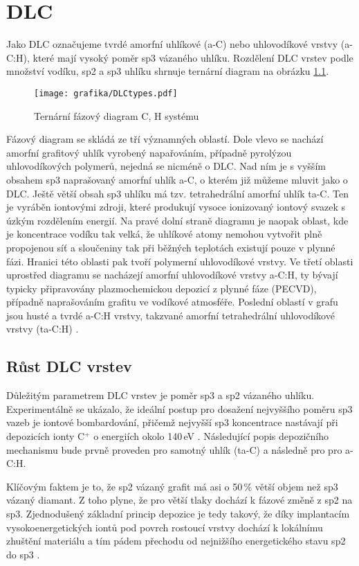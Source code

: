 \chapter{DLC}
Jako DLC označujeme tvrdé amorfní uhlíkové (a-C) nebo uhlovodíkové vrstvy (a-C:H), které mají vysoký poměr sp3 vázaného uhlíku. Rozdělení DLC vrstev podle množství vodíku, sp2 a sp3 uhlíku shrnuje ternární diagram na obrázku \ref{DLCtypes}.

\begin{figure}[htbp]
  \centering
  \texttt{[image: grafika/DLCtypes.pdf]}
  \caption{Ternární fázový diagram C, H systému \cite{Robertson2002}}
  \label{DLCtypes}
\end{figure}

Fázový diagram se skládá ze tří významných oblastí. Dole vlevo se nachází amorfní grafitový uhlík vyrobený napařováním, případně pyrolýzou uhlovodíkových polymerů, nejedná se nicméně o DLC. Nad ním je s vyšším obsahem sp3 naprašovaný amorfní uhlík a-C, o kterém již můžeme mluvit jako o DLC. Ještě větší obsah sp3 uhlíku má tzv. tetrahedrální amorfní uhlík ta-C. Ten je vyráběn iontovými zdroji, které produkují vysoce ionizovaný iontový svazek s úzkým rozdělením energií. Na pravé dolní straně diagramu je naopak oblast, kde je koncentrace vodíku tak velká, že uhlíkové atomy nemohou vytvořit plně propojenou síť a sloučeniny tak při běžných teplotách existují pouze v plynné fázi. Hranici této oblasti pak tvoří polymerní uhlovodíkové vrstvy. Ve třetí oblasti uprostřed diagramu se nacházejí amorfní uhlovodíkové vrstvy a-C:H, ty bývají typicky připravovány plazmochemickou depozicí z plynné fáze (PECVD), případně naprašováním grafitu ve vodíkové atmosféře. Poslední oblastí v grafu jsou husté a tvrdé a-C:H vrstvy, takzvané amorfní tetrahedrální uhlovodíkové vrstvy (ta-C:H) \cite{Donnet2008a}.    


\section{Růst DLC vrstev}
Důležitým parametrem DLC vrstev je poměr sp3 a sp2 vázaného uhlíku. Experimentálně se ukázalo, že ideální postup pro dosažení nejvyššího poměru sp3 vazeb je iontové bombardování, přičemž nejvyšší sp3 koncentrace nastávají při depozicích ionty C$^+$ o energiích okolo 140\,eV \cite{Fallon1993}. Následující popis depozičního mechanismu bude prvně proveden pro samotný uhlík (ta-C) a následně pro pro a-C:H.

Klíčovým faktem je to, že sp2 vázaný grafit má asi o 50\,\% větší objem než sp3 vázaný diamant. Z toho plyne, že pro větší tlaky dochází k fázové změně z sp2 na sp3. Zjednodušený základní princip depozice je tedy takový, že díky implantacím vysokoenergetických iontů pod povrch rostoucí vrstvy dochází k lokálnímu zhuštění materiálu a tím pádem přechodu od nejnižšího energetického stavu sp2 do sp3 \cite{McKenzie1991}.

